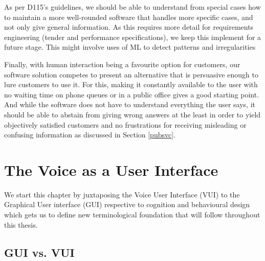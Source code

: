 As per D115's guidelines, we should be able to understand from special cases how to maintain a more well-rounded software that handles more specific cases, and not only give general information. As this requires more detail for requirements engineering (tender and performance specifications), we keep this implement for a future stage. This might involve uses of ML to detect patterns and irregularities

Finally, with human interaction being a favourite option for customers, our software solution competes to present an alternative that is persuasive enough to lure customers to use it. For this, making it constantly available to the user with no waiting time on phone queues or in a public office gives a good starting point. And while the software does not have to understand everything the user says, it should be able to abstain from giving wrong answers at the least in order to yield objectively satisfied customers and no frustrations for receiving misleading or confusing information as discussed in Section \ref{pubsvc}.






%












\chapter{The Voice as a User Interface} 
\label{vui}


We start this chapter by juxtaposing the Voice User Interface (VUI) to the Graphical User interface (GUI) respective to cognition and behavioural design which gets us to define new terminological foundation that will follow throughout this thesis.

\section{GUI vs. VUI}
\label{guivsvui}

